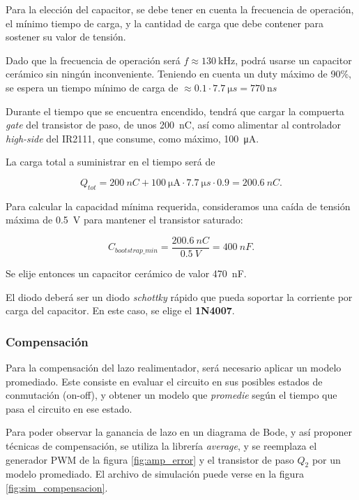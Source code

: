 \documentclass[]{article}
\begin{document}
	Para la elección del capacitor, se debe tener en cuenta la frecuencia de operación, el mínimo tiempo de carga, y la cantidad de carga que debe contener para sostener su valor de tensión.
	
	Dado que la frecuencia de operación será $f\approx\SI{130}{\kilo\hertz}$, podrá usarse un capacitor cerámico sin ningún inconveniente. Teniendo en cuenta un duty máximo de 90\%, se espera un tiempo mínimo de carga de $\approx 0.1 \cdot \SI{7.7}{\micro s} = \SI{770}{\nano s}$
	
	Durante el tiempo que se encuentra encendido, tendrá que cargar la compuerta \textit{gate} del transistor de paso, de unos \SI{200}{nC}, así como alimentar al controlador \textit{high-side} del IR2111, que consume, como máximo, \SI{100}{\micro\ampere}.
	
	La carga total a suministrar en el tiempo será de 
	
	\begin{equation}
		Q_{tot} = \SI{200}{nC} + \SI{100}{\micro\ampere} \cdot \SI{7.7}{\micro s} \cdot 0.9 = \SI{200.6}{nC}.
	\end{equation}
	
	Para calcular la capacidad mínima requerida, consideramos una caída de tensión máxima de \SI{0.5}{V} para mantener el transistor saturado:
	
	\begin{equation}
		C_{bootstrap\_min} = \frac{\SI{200.6}{nC}}{\SI{0.5}{V}} =  \SI{400}{nF}.
	\end{equation}
	
	Se elije entonces un capacitor cerámico de valor \SI{470}{nF}.
	
	El diodo deberá ser un diodo \textit{schottky} rápido que pueda soportar la corriente por carga del capacitor. En este caso, se elige el \textbf{1N4007}.
	
	\subsubsection{Compensación}
	
	Para la compensación del lazo realimentador, será necesario aplicar un modelo promediado. Este consiste en evaluar el circuito en sus posibles estados de conmutación (on-off), y obtener un modelo que \textit{promedie} según el tiempo que pasa el circuito en ese estado.
	
	Para poder observar la ganancia de lazo en un diagrama de Bode, y así proponer técnicas de compensación, se utiliza la librería \textit{average}, y se reemplaza el generador PWM de la figura \ref{fig:amp_error} y el transistor de paso $Q_2$ por un modelo promediado. El archivo de simulación puede verse en la figura \ref{fig:sim_compensacion}.
	
\end{document}
